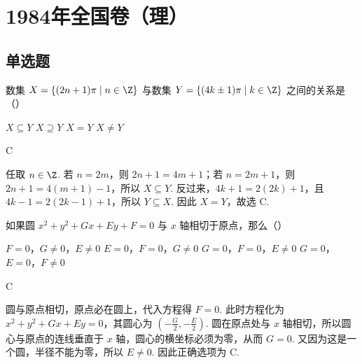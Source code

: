 \documentclass[UTF8,a4paper,oneside,11pt]{ctexbook}
\begin{document}
\mainmatter

\chapter{1984年全国卷（理）}

\section{单选题}

\begin{problem}

数集 \(X = \{(2n + 1)\pi\mid n\in\Z\}\) 与数集 \(Y = \{(4k \pm 1)\pi\mid k\in\Z\}\) 之间的关系是（\quad）

\choices
    {\(X \subseteq Y\)}
    {\(X \supseteq Y\)}
    {\(X = Y\)}
    {\(X \neq Y\)}
\end{problem}

\begin{answer}
C
\end{answer}

\begin{solution}
任取 \(n\in\Z\). 若 \(n=2m\)，则 \(2n+1=4m+1\)；若 \(n=2m+1\)，则 \(2n+1=4(m+1)-1\)，所以 \(X\subseteq Y\). 反过来，\(4k+1=2(2k)+1\)，且 \(4k-1=2(2k-1)+1\)，所以 \(Y\subseteq X\). 因此 \(X=Y\)，故选 C.
\end{solution}

\begin{problem}

如果圆 \(x^{2} + y^{2} + Gx + Ey + F = 0\) 与 \(x\) 轴相切于原点，那么（\quad）

\choices
    {\(F = 0\)，\(G \neq 0\)，\(E \neq 0\)}
    {\(E = 0\)，\(F = 0\)，\(G \neq 0\)}
    {\(G = 0\)，\(F = 0\)，\(E \neq 0\)}
    {\(G = 0\)，\(E = 0\)，\(F \neq 0\)}
\end{problem}

\begin{answer}
C
\end{answer}

\begin{solution}
圆与原点相切，原点必在圆上，代入方程得 \(F=0\). 此时方程化为 \(x^{2}+y^{2}+Gx+Ey=0\)，其圆心为 \(\left(-\frac{G}{2},-\frac{E}{2}\right)\). 圆在原点处与 \(x\) 轴相切，所以圆心与原点的连线垂直于 \(x\) 轴，圆心的横坐标必须为零，从而 \(G=0\). 又因为这是一个圆，半径不能为零，所以 \(E\neq0\). 因此正确选项为 C.
\end{solution}
\end{document}
